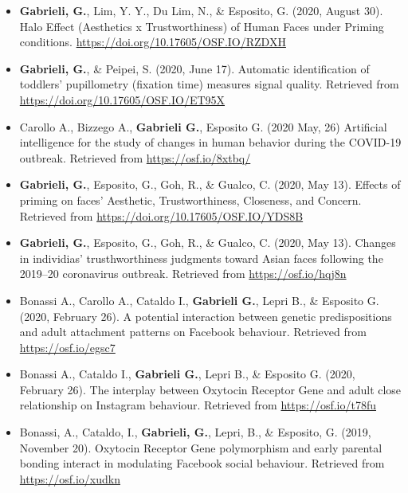 \documentclass[10pt,a4paper]{altacv}
\begin{document}
\begin{fullwidth}
\begin{itemize}
			\item \textbf{Gabrieli, G.}, Lim, Y. Y., Du Lim, N., \& Esposito, G. (2020, August 30). Halo Effect  (Aesthetics x Trustworthiness) of Human Faces under Priming conditions. \href{https://doi.org/10.17605/OSF.IO/RZDXH}{https://doi.org/10.17605/OSF.IO/RZDXH}
			
			\item \textbf{Gabrieli, G.}, \& Peipei, S. (2020, June 17). Automatic identification of toddlers’ pupillometry (fixation time) measures signal quality. Retrieved from \href{https://doi.org/10.17605/OSF.IO/ET95X}{https://doi.org/10.17605/OSF.IO/ET95X}
			
			\item Carollo A., Bizzego A., \textbf{Gabrieli G.}, Esposito G. (2020 May, 26) Artificial intelligence for the study of changes in human behavior during the COVID-19 outbreak. Retrieved from \href{https://osf.io/8xtbq/}{https://osf.io/8xtbq/}
			
			\item \textbf{Gabrieli, G.}, Esposito, G., Goh, R., \& Gualco, C. (2020, May 13). Effects of priming on faces' Aesthetic, Trustworthiness, Closeness, and Concern. Retrieved from \href{https://doi.org/10.17605/OSF.IO/YDS8B}{https://doi.org/10.17605/OSF.IO/YDS8B}
			
			\item \textbf{Gabrieli, G.}, Esposito, G., Goh, R., \& Gualco, C. (2020, May 13). Changes in individias' trusthworthiness judgments toward Asian faces following the 2019–20 coronavirus outbreak. Retrieved from \href{https://osf.io/hqj8n}{https://osf.io/hqj8n}
			
			\item Bonassi A., Carollo A., Cataldo I., \textbf{Gabrieli G.}, Lepri B., \& Esposito G. (2020, February 26). A potential interaction between genetic predispositions and adult attachment patterns on Facebook behaviour. Retrieved from \href{https://osf.io/egsc7}{https://osf.io/egsc7}
			
			\item Bonassi A., Cataldo I., \textbf{Gabrieli G.}, Lepri B., \& Esposito G. (2020, February 26). The interplay between Oxytocin Receptor Gene and adult close relationship on Instagram behaviour. Retrieved from \href{https://osf.io/t78fu}{https://osf.io/t78fu}
			
			\item Bonassi, A., Cataldo, I., \textbf{Gabrieli, G.}, Lepri, B., \& Esposito, G. (2019, November 20). Oxytocin Receptor Gene polymorphism and early parental bonding interact in modulating Facebook social behaviour. Retrieved from \href{https://osf.io/xudkn}{https://osf.io/xudkn}
			

\end{itemize}
\end{fullwidth}
\end{document}
